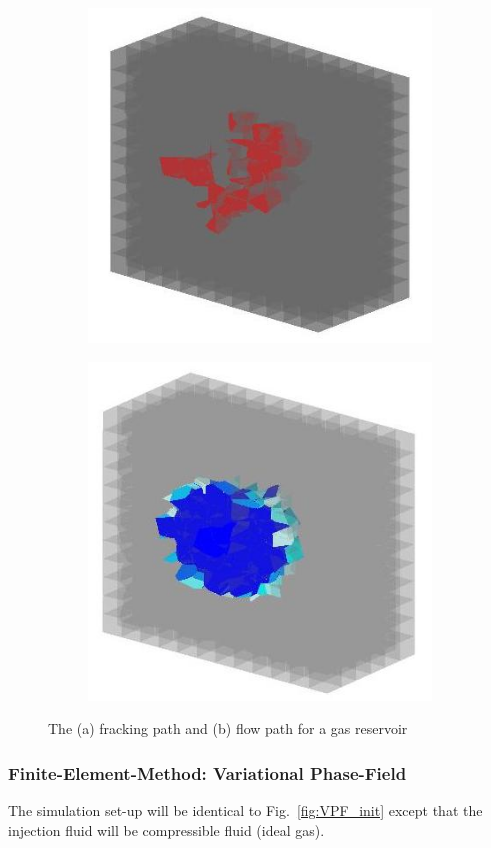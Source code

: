 \begin{figure}[!ht]
\begin{subfigure}[c]{0.48\textwidth}
\includegraphics[width=1\textwidth]{figures/Amir_ME4_Gas_Frack.png}
\subcaption{}
\label{fig:Amir_ME4_Gas_Frack}
\end{subfigure}
\hfill
\begin{subfigure}[c]{0.48\textwidth}
\includegraphics[width=1\textwidth]{figures/Amir_ME4_Gas_Flow.png}
\subcaption{}
\label{fig:Amir_ME4_Gas_Flow}
\end{subfigure}
\caption{The (a) fracking path and (b) flow path for a gas reservoir}
\end{figure}

\subsubsection*{Finite-Element-Method: Variational Phase-Field}

The simulation set-up will be identical to Fig.~\ref{fig:VPF_init} except that the injection fluid will be compressible fluid (ideal gas). 